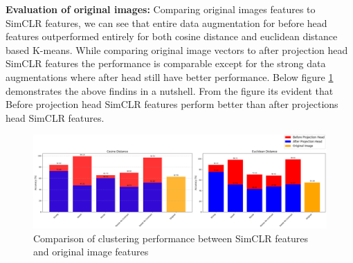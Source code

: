     \begin{table}[H]
        \centering
        \caption{Evaluation Results Using Different Distance Metrics for original images}
        \label{tab:distance_metrics}
    \end{table}
    
\textbf{Evaluation of original images:}
Comparing original images features to SimCLR features, we can see that entire data augmentation for  before head features outperformed entirely for both cosine distance and euclidean distance based K-means.
While comparing original image vectors to after projection head SimCLR features the performance is comparable except for the strong data augmentations where after head still have better performance. 
Below figure \ref{fig:cluster} demonstrates the above findins in a nutshell. From the figure its evident that Before projection head SimCLR features perform better than after projections head SimCLR features.

\begin{figure}[H]
    \centering
    \includegraphics[scale=0.37]{figures/cluster.png} 
    \caption{Comparison of clustering performance between SimCLR features and original image features}
    \label{fig:cluster}
\end{figure}

